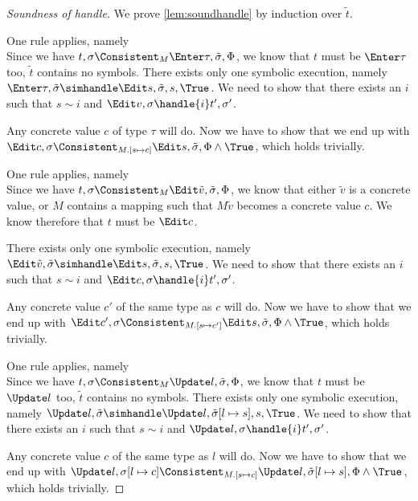 \begin{proof}[Soundness of handle]

  We prove \cref{lem:soundhandle} by induction over $\tilde{t}$.

 {One rule applies, namely \\
 Since we have $t,\sigma\Consistent_M\Enter \tau,\tilde{\sigma},\Phi$, we know that $t$ must be $\Enter \tau$ too, $\tilde{t}$ contains no symbols.
 There exists only one symbolic execution, namely $\Enter \tau,\tilde{\sigma}\simhandle\Edit s,\tilde{\sigma},s,\True$.
 We need to show that there exists an $i$ such that $s\sim i$ and $\Edit v,\sigma\handle{i}t',\sigma'$.

 Any concrete value $c$ of type $\tau$ will do. Now we have to show that we end up with $\Edit c,\sigma\Consistent_{M.[s\mapsto c]}\Edit s,\tilde{\sigma},\Phi\land\True$, which holds trivially.
 }

  {One rule applies, namely \\
  Since we have $t,\sigma\Consistent_M\Edit \tilde{v},\tilde{\sigma},\Phi$, we know that either $\tilde{v}$ is a concrete value, or $M$ contains a mapping such that $M\tilde{v}$ becomes a concrete value $c$. We know therefore that $t$ must be $\Edit c$.

  There exists only one symbolic execution, namely $\Edit \tilde{v},\tilde{\sigma}\simhandle\Edit s,\tilde{\sigma},s,\True$.
  We need to show that there exists an $i$ such that $s\sim i$ and $\Edit c,\sigma\handle{i}t',\sigma'$.

  Any concrete value $c'$ of the same type as $c$ will do. Now we have to show that we end up with $\Edit c',\sigma\Consistent_{M.[s\mapsto c']}\Edit s,\tilde{\sigma},\Phi\land\True$, which holds trivially.
  }


{One rule applies, namely \\

Since we have $t,\sigma\Consistent_M\Update l,\tilde{\sigma},\Phi$, we know that $t$ must be $\Update l$ too, $\tilde{t}$ contains no symbols.
There exists only one symbolic execution, namely $\Update l,\tilde{\sigma}\simhandle\Update l,\tilde{\sigma}[l\mapsto s],s,\True$.
We need to show that there exists an $i$ such that $s\sim i$ and $\Update l,\sigma\handle{i}t',\sigma'$.

Any concrete value $c$ of the same type as $l$ will do. Now we have to show that we end up with $\Update l,\sigma[l\mapsto c]\Consistent_{M.[s\mapsto c]}\Update l,\tilde{\sigma}[l\mapsto s],\Phi\land\True$, which holds trivially.
}



\end{proof}
